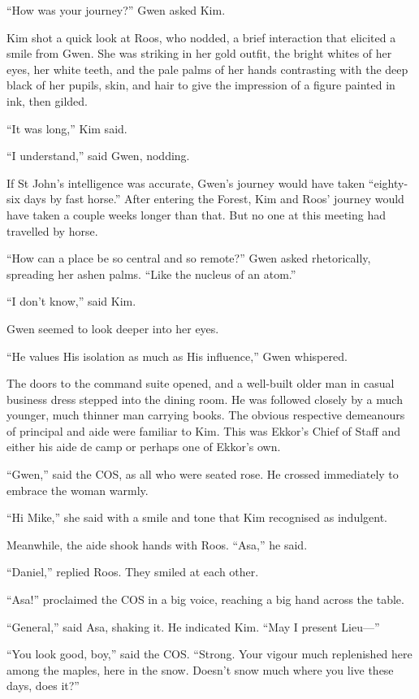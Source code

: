 \documentclass[11pt,a5paper]{article}
\begin{document}
``How was your journey?'' Gwen asked Kim.

Kim shot a quick look at Roos, who nodded, a brief interaction that elicited a smile from Gwen. She was striking in her gold outfit, the bright whites of her eyes, her white teeth, and the pale palms of her hands contrasting with the deep black of her pupils, skin, and hair to give the impression of a figure painted in ink, then gilded.

``It was long,'' Kim said.

``I understand,'' said Gwen, nodding.

If St John's intelligence was accurate, Gwen's journey would have taken ``eighty-six days by fast horse.'' After entering the Forest, Kim and Roos' journey would have taken a couple weeks longer than that. But no one at this meeting had travelled by horse.

``How can a place be so central and so remote?'' Gwen asked rhetorically, spreading her ashen palms. ``Like the nucleus of an atom.''

``I don't know,'' said Kim.

Gwen seemed to look deeper into her eyes.

``He values His isolation as much as His influence,'' Gwen whispered.

The doors to the command suite opened, and a well-built older man in casual business dress stepped into the dining room. He was followed closely by a much younger, much thinner man carrying books. The obvious respective demeanours of principal and aide were familiar to Kim. This was Ekkor's Chief of Staff and either his aide de camp or perhaps one of Ekkor's own.

``Gwen,'' said the COS, as all who were seated rose. He crossed immediately to embrace the woman warmly.

``Hi Mike,'' she said with a smile and tone that Kim recognised as indulgent.

Meanwhile, the aide shook hands with Roos. ``Asa,'' he said.

``Daniel,'' replied Roos. They smiled at each other.

``Asa!'' proclaimed the COS in a big voice, reaching a big hand across the table.

``General,'' said Asa, shaking it. He indicated Kim. ``May I present Lieu---''

``You look good, boy,'' said the COS. ``Strong. Your vigour much replenished here among the maples, here in the snow. Doesn't snow much where you live these days, does it?''
\end{document}
